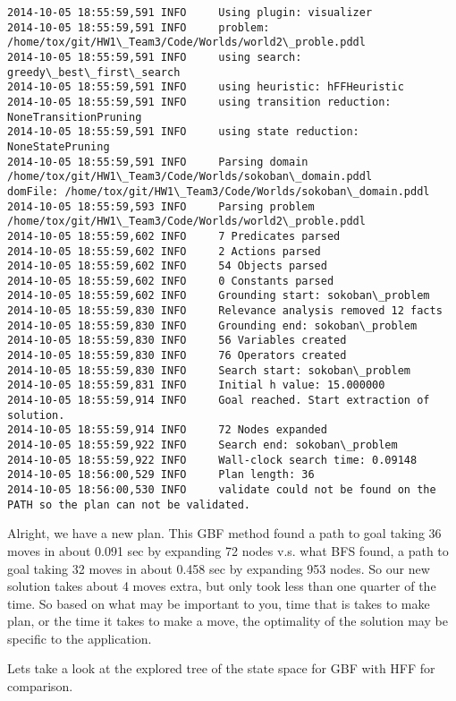 \documentclass{article}
\begin{document}
    \begin{Verbatim}[commandchars=\\\{\}]
2014-10-05 18:55:59,591 INFO     Using plugin: visualizer
2014-10-05 18:55:59,591 INFO     problem: /home/tox/git/HW1\_Team3/Code/Worlds/world2\_proble.pddl
2014-10-05 18:55:59,591 INFO     using search: greedy\_best\_first\_search
2014-10-05 18:55:59,591 INFO     using heuristic: hFFHeuristic
2014-10-05 18:55:59,591 INFO     using transition reduction: NoneTransitionPruning
2014-10-05 18:55:59,591 INFO     using state reduction: NoneStatePruning
2014-10-05 18:55:59,591 INFO     Parsing domain /home/tox/git/HW1\_Team3/Code/Worlds/sokoban\_domain.pddl
domFile: /home/tox/git/HW1\_Team3/Code/Worlds/sokoban\_domain.pddl
2014-10-05 18:55:59,593 INFO     Parsing problem /home/tox/git/HW1\_Team3/Code/Worlds/world2\_proble.pddl
2014-10-05 18:55:59,602 INFO     7 Predicates parsed
2014-10-05 18:55:59,602 INFO     2 Actions parsed
2014-10-05 18:55:59,602 INFO     54 Objects parsed
2014-10-05 18:55:59,602 INFO     0 Constants parsed
2014-10-05 18:55:59,602 INFO     Grounding start: sokoban\_problem
2014-10-05 18:55:59,830 INFO     Relevance analysis removed 12 facts
2014-10-05 18:55:59,830 INFO     Grounding end: sokoban\_problem
2014-10-05 18:55:59,830 INFO     56 Variables created
2014-10-05 18:55:59,830 INFO     76 Operators created
2014-10-05 18:55:59,830 INFO     Search start: sokoban\_problem
2014-10-05 18:55:59,831 INFO     Initial h value: 15.000000
2014-10-05 18:55:59,914 INFO     Goal reached. Start extraction of solution.
2014-10-05 18:55:59,914 INFO     72 Nodes expanded
2014-10-05 18:55:59,922 INFO     Search end: sokoban\_problem
2014-10-05 18:55:59,922 INFO     Wall-clock search time: 0.09148
2014-10-05 18:56:00,529 INFO     Plan length: 36
2014-10-05 18:56:00,530 INFO     validate could not be found on the PATH so the plan can not be validated.
    \end{Verbatim}

    Alright, we have a new plan. This GBF method found a path to goal taking
36 moves in about 0.091 sec by expanding 72 nodes v.s. what BFS found, a
path to goal taking 32 moves in about 0.458 sec by expanding 953 nodes.
So our new solution takes about 4 moves extra, but only took less than
one quarter of the time. So based on what may be important to you, time
that is takes to make plan, or the time it takes to make a move, the
optimality of the solution may be specific to the application.

Lets take a look at the explored tree of the state space for GBF with
HFF for comparison.
\end{document}
